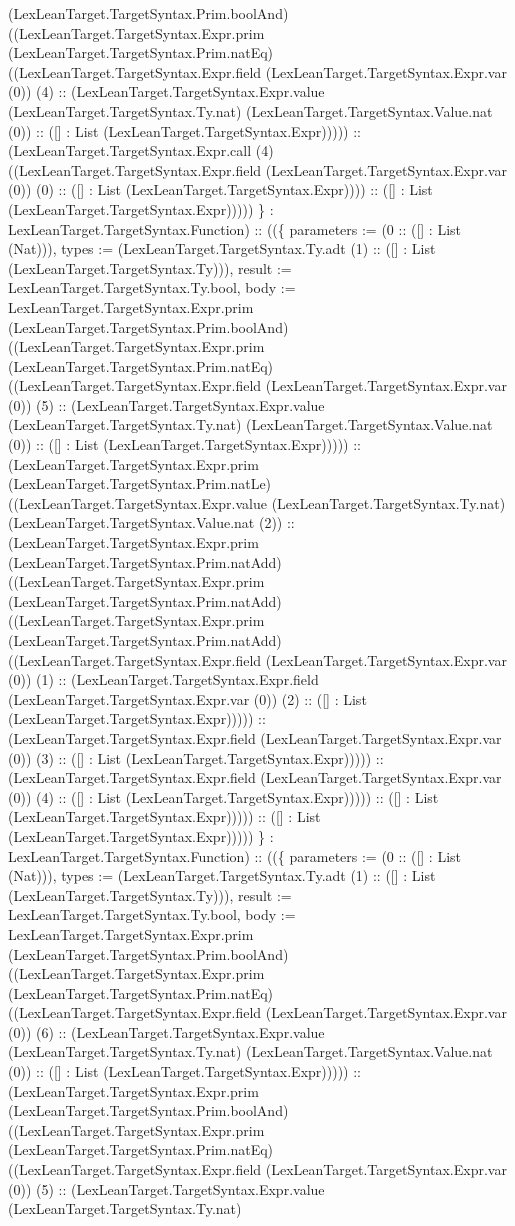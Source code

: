 \documentclass[11pt]{article}
\begin{document}
(LexLeanTarget.TargetSyntax.Prim.boolAnd) ((LexLeanTarget.TargetSyntax.Expr.prim (LexLeanTarget.TargetSyntax.Prim.natEq) ((LexLeanTarget.TargetSyntax.Expr.field (LexLeanTarget.TargetSyntax.Expr.var (0)) (4) :: (LexLeanTarget.TargetSyntax.Expr.value (LexLeanTarget.TargetSyntax.Ty.nat) (LexLeanTarget.TargetSyntax.Value.nat (0)) :: ([] : List (LexLeanTarget.TargetSyntax.Expr))))) :: (LexLeanTarget.TargetSyntax.Expr.call (4) ((LexLeanTarget.TargetSyntax.Expr.field (LexLeanTarget.TargetSyntax.Expr.var (0)) (0) :: ([] : List (LexLeanTarget.TargetSyntax.Expr)))) :: ([] : List (LexLeanTarget.TargetSyntax.Expr))))) \} : LexLeanTarget.TargetSyntax.Function) :: ((\{ parameters := (0 :: ([] : List (Nat))), types := (LexLeanTarget.TargetSyntax.Ty.adt (1) :: ([] : List (LexLeanTarget.TargetSyntax.Ty))), result := LexLeanTarget.TargetSyntax.Ty.bool, body := LexLeanTarget.TargetSyntax.Expr.prim (LexLeanTarget.TargetSyntax.Prim.boolAnd) ((LexLeanTarget.TargetSyntax.Expr.prim (LexLeanTarget.TargetSyntax.Prim.natEq) ((LexLeanTarget.TargetSyntax.Expr.field (LexLeanTarget.TargetSyntax.Expr.var (0)) (5) :: (LexLeanTarget.TargetSyntax.Expr.value (LexLeanTarget.TargetSyntax.Ty.nat) (LexLeanTarget.TargetSyntax.Value.nat (0)) :: ([] : List (LexLeanTarget.TargetSyntax.Expr))))) :: (LexLeanTarget.TargetSyntax.Expr.prim (LexLeanTarget.TargetSyntax.Prim.natLe) ((LexLeanTarget.TargetSyntax.Expr.value (LexLeanTarget.TargetSyntax.Ty.nat) (LexLeanTarget.TargetSyntax.Value.nat (2)) :: (LexLeanTarget.TargetSyntax.Expr.prim (LexLeanTarget.TargetSyntax.Prim.natAdd) ((LexLeanTarget.TargetSyntax.Expr.prim (LexLeanTarget.TargetSyntax.Prim.natAdd) ((LexLeanTarget.TargetSyntax.Expr.prim (LexLeanTarget.TargetSyntax.Prim.natAdd) ((LexLeanTarget.TargetSyntax.Expr.field (LexLeanTarget.TargetSyntax.Expr.var (0)) (1) :: (LexLeanTarget.TargetSyntax.Expr.field (LexLeanTarget.TargetSyntax.Expr.var (0)) (2) :: ([] : List (LexLeanTarget.TargetSyntax.Expr))))) :: (LexLeanTarget.TargetSyntax.Expr.field (LexLeanTarget.TargetSyntax.Expr.var (0)) (3) :: ([] : List (LexLeanTarget.TargetSyntax.Expr))))) :: (LexLeanTarget.TargetSyntax.Expr.field (LexLeanTarget.TargetSyntax.Expr.var (0)) (4) :: ([] : List (LexLeanTarget.TargetSyntax.Expr))))) :: ([] : List (LexLeanTarget.TargetSyntax.Expr))))) :: ([] : List (LexLeanTarget.TargetSyntax.Expr))))) \} : LexLeanTarget.TargetSyntax.Function) :: ((\{ parameters := (0 :: ([] : List (Nat))), types := (LexLeanTarget.TargetSyntax.Ty.adt (1) :: ([] : List (LexLeanTarget.TargetSyntax.Ty))), result := LexLeanTarget.TargetSyntax.Ty.bool, body := LexLeanTarget.TargetSyntax.Expr.prim (LexLeanTarget.TargetSyntax.Prim.boolAnd) ((LexLeanTarget.TargetSyntax.Expr.prim (LexLeanTarget.TargetSyntax.Prim.natEq) ((LexLeanTarget.TargetSyntax.Expr.field (LexLeanTarget.TargetSyntax.Expr.var (0)) (6) :: (LexLeanTarget.TargetSyntax.Expr.value (LexLeanTarget.TargetSyntax.Ty.nat) (LexLeanTarget.TargetSyntax.Value.nat (0)) :: ([] : List (LexLeanTarget.TargetSyntax.Expr))))) :: (LexLeanTarget.TargetSyntax.Expr.prim (LexLeanTarget.TargetSyntax.Prim.boolAnd) ((LexLeanTarget.TargetSyntax.Expr.prim (LexLeanTarget.TargetSyntax.Prim.natEq) ((LexLeanTarget.TargetSyntax.Expr.field (LexLeanTarget.TargetSyntax.Expr.var (0)) (5) :: (LexLeanTarget.TargetSyntax.Expr.value (LexLeanTarget.TargetSyntax.Ty.nat) 
\end{document}
